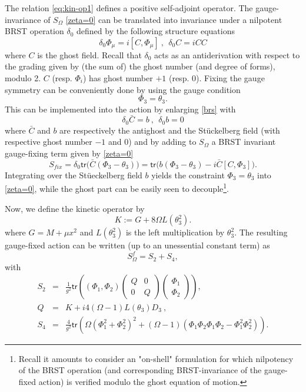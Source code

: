 \documentclass[11pt]{book}
\newcommand{\tr}{\mathsf{tr}}
\theoremstyle{break}
\begin{document}
The relation \eqref{eq:kin-op1} defines a positive self-adjoint operator. The gauge-invariance of $S_\Omega$ \eqref{zeta=0} can be translated into invariance under a nilpotent BRST operation $\delta_0$ defined by the following structure equations
%
\begin{equation}
\delta_0 \Phi_\mu = i [C,\Phi_\mu] \ , \ \ \delta_0C=iCC\label{brs}
\end{equation}
%
where $C$ is the ghost field. Recall that $\delta_0$ acts as an antiderivation with respect to the grading given by (the sum of) the ghost number (and degree of forms), modulo 2. $C$ (resp. $\Phi_i$) has ghost number $+1$ (resp. $0$). Fixing the gauge symmetry can be conveniently done by using the gauge condition 
\begin{equation}
\Phi_3=\theta_3\label{special-gauge}.
\end{equation}
This can be implemented into the action by enlarging \eqref{brs} with%
%
\begin{equation}
\delta_0 {\bar{C}} = b \ , \ \ \delta_0b = 0 \label{contractible-brs}
\end{equation}
%
where ${\bar{C}}$ and $b$ are respectively the antighost and the St\"uckelberg field (with respective ghost number $-1$ and $0$) and by adding to $S_\Omega$ a BRST invariant gauge-fixing term given by \eqref{zeta=0}%
%
\begin{equation}
S_{fix}=\delta_0\tr\big({\bar{C}}(\Phi_3-\theta_3) \big)=\tr\big(b(\Phi_3-\theta_3)-i{\bar{C}}[C,\Phi_3]\big)\label{gauge-fix}.
\end{equation}
%
Integrating over the St\"ueckelberg field $b$ yields the constraint $\Phi_3=\theta_3$ into \eqref{zeta=0}, while the ghost part can be easily seen to decouple{\footnote{Recall it amounts to consider an "on-shell" formulation for which nilpotency of the BRST operation (and corresponding BRST-invariance of the gauge-fixed action) is verified modulo the ghost equation of motion.}}. \par 
Now, we define the kinetic operator by%
%
\begin{equation}
K:=G+8\Omega L(\theta_3^2)\label{operator-K}.
\end{equation}
where $G=M+\mu x^2$ and $L(\theta^{2}_{3})$ is the left multiplication by $\theta^{2}_{3}$.
%
The resulting gauge-fixed action can be written (up to an unessential constant term) as
%
\begin{equation}
S^f_\Omega=S_2+S_4\label{stot},
\end{equation}
with%
\begin{eqnarray}
S_2 &=& \frac{1}{g^2} \tr ((\Phi_1,\Phi_2)
\begin{pmatrix}
Q&0\\
0&Q
\end{pmatrix} 
\begin{pmatrix}
\Phi_1\\
\Phi_2
\end{pmatrix} 
) , \nonumber \\
Q &=& K + i4 (\Omega-1) L(\theta_3) D_3 \ , \label{squad1} \\[5pt]
S_4 &=& \frac{4}{g^2} \tr \left( \Omega (\Phi_1^2 + \Phi_2^2)^2 + (\Omega-1)(\Phi_1\Phi_2\Phi_1\Phi_2 - \Phi_1^2\Phi_2^2) \right) . \label{squart}
\end{eqnarray}
\end{document}
